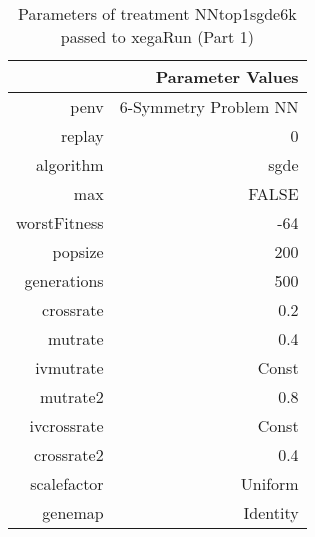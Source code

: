 \begin{table}[ht]
\centering
\begin{tabular}{rr}
  \hline
 & Parameter Values \\ 
  \hline
penv & 6-Symmetry Problem NN \\ 
  replay & 0 \\ 
  algorithm & sgde \\ 
  max & FALSE \\ 
  worstFitness & -64 \\ 
  popsize & 200 \\ 
  generations & 500 \\ 
  crossrate & 0.2 \\ 
  mutrate & 0.4 \\ 
  ivmutrate & Const \\ 
  mutrate2 & 0.8 \\ 
  ivcrossrate & Const \\ 
  crossrate2 & 0.4 \\ 
  scalefactor & Uniform \\ 
  genemap & Identity \\ 
   \hline
\end{tabular}
\caption{ Parameters of treatment NNtop1sgde6k passed to xegaRun
 (Part 1)} 
\end{table}
